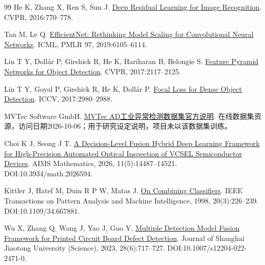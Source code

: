 \begin{thebibliography}{99}
  He K, Zhang X, Ren S, Sun J. \protect\href{https://arxiv.org/abs/1512.03385}{Deep Residual Learning for Image Recognition}. CVPR, 2016:770--778.

  Tan M, Le Q. \protect\href{https://proceedings.mlr.press/v97/tan19a.html}{EfficientNet: Rethinking Model Scaling for Convolutional Neural Networks}. ICML, PMLR 97, 2019:6105--6114.

  Lin T Y, Dollár P, Girshick R, He K, Hariharan B, Belongie S. \protect\href{https://arxiv.org/abs/1612.03144}{Feature Pyramid Networks for Object Detection}. CVPR, 2017:2117--2125.

  Lin T Y, Goyal P, Girshick R, He K, Dollár P. \protect\href{https://arxiv.org/abs/1708.02002}{Focal Loss for Dense Object Detection}. ICCV, 2017:2980--2988.

  MVTec Software GmbH. \protect\href{https://www.mvtec.com/research-teaching/datasets/mvtec-ad}{MVTec AD工业异常检测数据集官方说明}. 在线数据集资源，访问日期2026-10-06；用于研究设定说明，项目未以该数据集训练。

  Choi K J, Seong J T. \protect\href{https://www.aimspress.com/article/doi/10.3934/math.2026594}{A Decision-Level Fusion Hybrid Deep Learning Framework for High-Precision Automated Optical Inspection of VCSEL Semiconductor Devices}. AIMS Mathematics, 2026, 11(5):14487--14521. DOI:10.3934/math.2026594.

  Kittler J, Hatef M, Duin R P W, Matas J. \protect\href{https://people.sabanciuniv.edu/berrin/cs512/reading/kittler-combining.pdf}{On Combining Classifiers}. IEEE Transactions on Pattern Analysis and Machine Intelligence, 1998, 20(3):226--239. DOI:10.1109/34.667881.

  Wu X, Zhang Q, Wang J, Yao J, Guo Y. \protect\href{https://xuebao.sjtu.edu.cn/sjtu_en/CN/Y2023/V28/I6/717}{Multiple Detection Model Fusion Framework for Printed Circuit Board Defect Detection}. Journal of Shanghai Jiaotong University (Science), 2023, 28(6):717--727. DOI:10.1007/s12204-022-2471-0.

\end{thebibliography}
